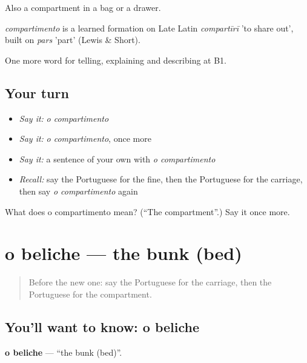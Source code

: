 Also a compartment in a bag or a drawer.

\begin{cousinweb}
\emph{compartimento} is a learned formation on Late Latin \emph{compartīrī} 'to share out', built on \emph{pars} 'part' (Lewis \& Short).
\end{cousinweb}

\begin{grammarlens}[title={What you've built}]
One more word for telling, explaining and describing at B1.
\end{grammarlens}

\subsection*{Your turn}
\begin{itemize}
\raggedright
  \item \emph{Say it:} \emph{o compartimento}
  \item \emph{Say it:} \emph{o compartimento}, once more
  \item \emph{Say it:} a sentence of your own with \emph{o compartimento}
  \item \emph{Recall:} say the Portuguese for the fine, then the Portuguese for the carriage, then say \emph{o compartimento} again
\end{itemize}

\begin{tcolorbox}[breakable,colback=teal!4,colframe=teal!35!black,title={Before you move on}]
What does o compartimento mean? (\textquotedblleft{}The compartment\textquotedblright{}.) Say it once more.
\end{tcolorbox}
\section[o beliche]{o beliche — the bunk (bed)}

\label{lesson:PT-C415-beliche}



\begin{quote}
Before the new one: say the Portuguese for the carriage, then the Portuguese for the compartment.
\end{quote}

\subsection*{You'll want to know: o beliche}
\textbf{o beliche} — \textquotedblleft{}the bunk (bed)\textquotedblright{}.

